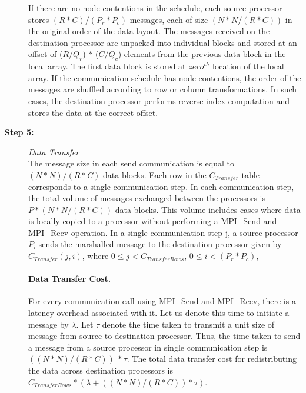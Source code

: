\documentclass[letterpaper]{llncs}
\begin{document}
\begin{description}
If there are no node contentions in the schedule, each source processor stores 
$(R \ast C)/(P_{r} \ast P_{c})$ messages, each of size $(N \ast N/(R \ast C))$ in the original order of the data layout.
The messages received on the destination processor are unpacked into individual blocks
 and stored 
at an offset of ($R/Q_r$) $\ast$ ($C/Q_c$) elements from the previous data block 
in the local array. The first data block is stored at $zero^{th}$ location of the 
local array.
If the communication schedule has  node contentions, the order of the messages are shuffled according to row or column transformations. In such cases, the destination processor performs reverse index computation and stores the data at the correct offset.


\item[\textbf{Step 5:}] \hspace{0.05in}\textit{Data Transfer}\\
The message size in each send communication is equal to $(N \ast N)/(R\ast C)$ data blocks.
Each row in the $C_{Transfer}$ table corresponds to  a single communication step. 
In each communication step, the total volume of messages exchanged between the processors is $P \ast (N\ast N/(R\ast C))$ data blocks. 
This volume includes cases where data is locally copied to a processor without performing a MPI\_Send and MPI\_Recv operation.
 In a single communication step j, a source processor $P_i$ sends the marshalled  
message to the destination processor given by $C_{Transfer}(j,i)$, where  $0\leq j<C_{TransferRows}$, $0\leq i<(P_r \ast P_c)$, 
 
\paragraph*{Data Transfer Cost. }
For every communication call using MPI\_Send and MPI\_Recv, there is a latency overhead associated with it. Let us denote this time to initiate a message by $\lambda$. 
Let $\tau$ denote the time taken to transmit a unit size of message from source to destination processor. Thus, the time taken to send a message from a source processor
in single communication step is $((N \ast N)/(R\ast C))\ \ast \tau$. The total data transfer cost for redistributing the data across destination processors is
$C_{TransferRows} \ast (\lambda +((N \ast N)/(R\ast C)) \ast \tau)$.
\end{description}
\end{document}
